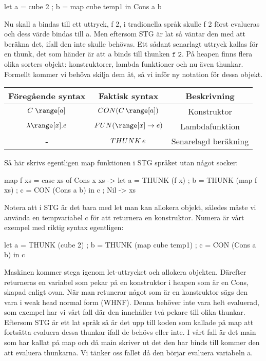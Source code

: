 \documentclass[../Core]{subfiles}
\begin{document}
\begin{codeEx}
let { a = cube 2
    ; b = map cube temp1
    } in Cons a b
\end{codeEx}

Nu skall a bindas till ett uttryck, f 2, i tradionella språk skulle
f 2 först evalueras och dess värde bindas till a. Men eftersom STG
är lat så väntar den med att beräkna det, ifall den inte skulle behövas.
Ett sådant senarlagt uttryck kallas för en thunk, det som händer är
att a binds till thunken $\mathtt{f\;2}$. På heapen finns flera olika
sorters objekt: konstruktorer, lambda funktioner och nu även thunkar.
Formellt kommer vi behöva skilja dem åt, så vi inför ny notation för
dessa objekt.

\begin{tabular}{ccc}
Föregående syntax & Faktisk syntax & Beskrivning\tabularnewline
\hline
$C\;\range[a]$ & $\CON C{\range[a]}$ & Konstruktor\tabularnewline
$\lambda\range[x].e$ & $\FUN{\range[x]}e$ & Lambdafunktion\tabularnewline
- & $THUNK\,e$ & Senarelagd beräkning\tabularnewline
\end{tabular}

Så här skrivs egentligen map funktionen i STG språket utan något socker:

\begin{codeEx}
map f xs = case xs of
    { Cons x xs -> let { a = THUNK (f x) 
                       ; b = THUNK (map f xs)
                       ; c = CON (Cons a b)
                       } in c
    ; Nil       -> xs
    }
\end{codeEx}

Notera att i STG är det bara med let man kan allokera objekt, således
måste vi använda en tempvariabel c för att returnera en konstruktor.
Numera är vårt exempel med riktig syntax egentligen:

\begin{codeEx}
let { a = THUNK (cube 2)
    ; b = THUNK (map cube temp1)
    ; c = CON (Cons a b)
    } in c
\end{codeEx}

Maskinen kommer stega igenom let-uttrycket och allokera objekten.
Därefter returneras en variabel som pekar på en konstruktor i heapen
som är en Cons, skapad enligt ovan. När man retunerar något som är
en konstruktor sägs den vara i weak head normal form (WHNF). Denna
behöver inte vara helt evaluerad, som exempel har vi vårt fall där
den innehåller två pekare till olika thunkar. Eftersom STG är ett
lat språk så är det upp till koden som kallade på map att fortsätta
evaluera dessa thunkar ifall de behövs eller inte. I vårt fall är
det main som har kallat på map och då main skriver ut det den har
binds till kommer den att evaluera thunkarna. Vi tänker oss fallet
då den börjar evaluera variabeln a.
\end{document}
